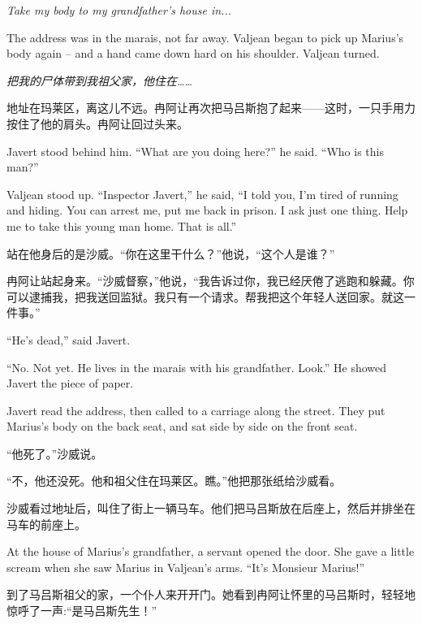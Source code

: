 \documentclass[fontset=ubuntu, zihao=5]{ctexart}
\begin{document}
\begin{paracol}{2}
\emph{Take my body to my grandfather's house in...}

The address was in the marais, not far away. Valjean began to pick up Marius's body again – and a hand came down hard on his shoulder. Valjean turned.

\switchcolumn

\emph{把我的尸体带到我祖父家，他住在……}

地址在玛莱区，离这儿不远。冉阿让再次把马吕斯抱了起来——这时，一只手用力按住了他的肩头。冉阿让回过头来。

\switchcolumn*

Javert stood behind him. ``What are you doing here?'' he said. ``Who is this man?''

Valjean stood up. ``Inspector Javert,'' he said, ``I told you, I'm tired of running and hiding. You can arrest me, put me back in prison. I ask just one thing. Help me to take this young man home. That is all.''


\switchcolumn

站在他身后的是沙威。“你在这里干什么？”他说，“这个人是谁？”

冉阿让站起身来。“沙威督察，”他说，“我告诉过你，我已经厌倦了逃跑和躲藏。你可以逮捕我，把我送回监狱。我只有一个请求。帮我把这个年轻人送回家。就这一件事。”

\switchcolumn*

``He's dead,'' said Javert.

``No. Not yet. He lives in the marais with his grandfather. Look.'' He showed Javert the piece of paper.

Javert read the address, then called to a carriage along the street. They put Marius's body on the back seat, and sat side by side on the front seat.

\switchcolumn

“他死了。”沙威说。

“不，他还没死。他和祖父住在玛莱区。瞧。”他把那张纸给沙威看。

沙威看过地址后，叫住了街上一辆马车。他们把马吕斯放在后座上，然后并排坐在马车的前座上。

\switchcolumn*

At the house of Marius's grandfather, a servant opened the door. She gave a little scream when she saw Marius in Valjean's arms. ``It's Monsieur Marius!''

\switchcolumn

到了马吕斯祖父的家，一个仆人来开开门。她看到冉阿让怀里的马吕斯时，轻轻地惊呼了一声:“是马吕斯先生！”


\end{paracol}
\end{document}
